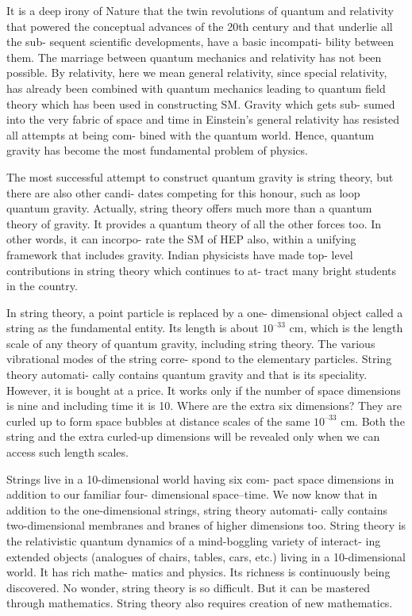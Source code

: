 It is a deep irony of Nature that the twin revolutions of
quantum and relativity that powered the conceptual
advances of the 20th century and that underlie all the sub-
sequent scientific developments, have a basic incompati-
bility between them. The marriage between quantum
mechanics and relativity has not been possible. By
relativity, here we mean general relativity, since special
relativity, has already been combined with quantum
mechanics leading to quantum field theory which has
been used in constructing SM. Gravity which gets sub-
sumed into the very fabric of space and time in Einstein’s
general relativity has resisted all attempts at being com-
bined with the quantum world. Hence, quantum gravity
has become the most fundamental problem of physics.

The most successful attempt to construct quantum
gravity is string theory, but there are also other candi-
dates competing for this honour, such as loop quantum
gravity. Actually, string theory offers much more than a
quantum theory of gravity. It provides a quantum theory
of all the other forces too. In other words, it can incorpo-
rate the SM of HEP also, within a unifying framework
that includes gravity. Indian physicists have made top-
level contributions in string theory which continues to at-
tract many bright students in the country.

In string theory, a point particle is replaced by a one-
dimensional object called a string as the fundamental
entity. Its length is about $10^{–33}$ cm, which is the length
scale of any theory of quantum gravity, including string
theory. The various vibrational modes of the string corre-
spond to the elementary particles. String theory automati-
cally contains quantum gravity and that is its speciality.
However, it is bought at a price. It works only if the
number of space dimensions is nine and including time it
is 10. Where are the extra six dimensions? They are
curled up to form space bubbles at distance scales of the
same $10^{–33}$ cm. Both the string and the extra curled-up
dimensions will be revealed only when we can access
such length scales.

Strings live in a 10-dimensional world having six com-
pact space dimensions in addition to our familiar four-
dimensional space–time. We now know that in addition
to the one-dimensional strings, string theory automati-
cally contains two-dimensional membranes and branes of
higher dimensions too. String theory is the relativistic
quantum dynamics of a mind-boggling variety of interact-
ing extended objects (analogues of chairs, tables, cars,
etc.) living in a 10-dimensional world. It has rich mathe-
matics and physics. Its richness is continuously being
discovered. No wonder, string theory is so difficult. But it
can be mastered through mathematics. String theory also
requires creation of new mathematics.

